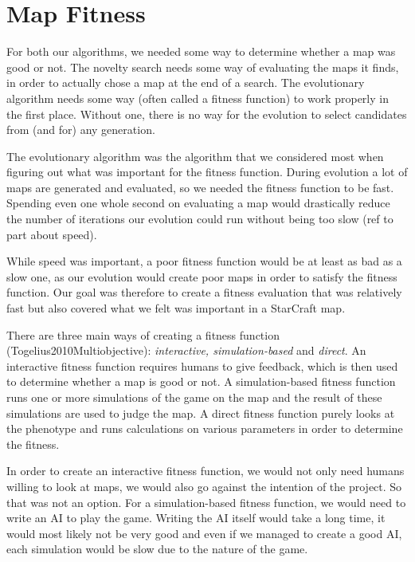 \section{Map Fitness}
\label{MapFitness}

For both our algorithms, we needed some way to determine whether a map was good or not. The novelty search needs some way of evaluating the maps it finds, in order to actually chose a map at the end of a search. The evolutionary algorithm needs some way (often called a fitness function) to work properly in the first place. Without one, there is no way for the evolution to select candidates from (and for) any generation.

The evolutionary algorithm was the algorithm that we considered most when figuring out what was important for the fitness function. During evolution a lot of maps are generated and evaluated, so we needed the fitness function to be fast. Spending even one whole second on evaluating a map would drastically reduce the number of iterations our evolution could run without being too slow (ref to part about speed).

While speed was important, a poor fitness function would be at least as bad as a slow one, as our evolution would create poor maps in order to satisfy the fitness function. Our goal was therefore to create a fitness evaluation that was relatively fast but also covered what we felt was important in a StarCraft map.

There are three main ways of creating a fitness function (Togelius2010Multiobjective): \textit{interactive, simulation-based} and \textit{direct}. An interactive fitness function requires humans to give feedback, which is then used to determine whether a map is good or not. A simulation-based fitness function runs one or more simulations of the game on the map and the result of these simulations are used to judge the map. A direct fitness function purely looks at the phenotype and runs calculations on various parameters in order to determine the fitness.

In order to create an interactive fitness function, we would not only need humans willing to look at maps, we would also go against the intention of the project. So that was not an option. For a simulation-based fitness function, we would need to write an AI to play the game. Writing the AI itself would take a long time, it would most likely not be very good and even if we managed to create a good AI, each simulation would be slow due to the nature of the game.

